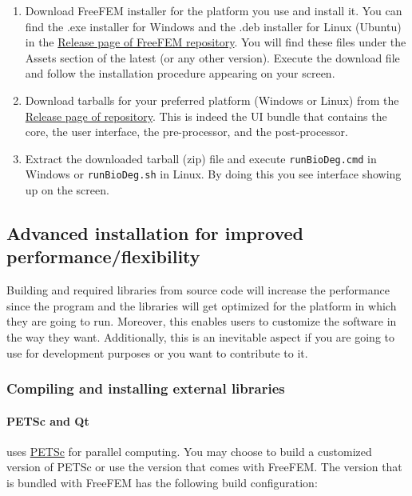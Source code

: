 \begin{enumerate}
\item
Download FreeFEM installer for the platform you use and install it. You can find the {.exe} installer for Windows and the {.deb} installer for Linux (Ubuntu) in the \href{https://github.com/FreeFem/FreeFem-sources/releases}{Release page of FreeFEM repository}. You will find these files under the Assets section of the latest (or any other version). Execute the download file and follow the installation procedure appearing on your screen.
\item
Download \biodeg{} tarballs for your preferred platform (Windows or Linux) from the \href{https://github.com/mbarzegary/BioDeg-UI/releases}{Release page of \biodeg{} repository}. This is indeed the \biodeg{} UI bundle that contains the \biodeg{} core, the user interface, the pre-processor, and the post-processor.
\item
Extract the downloaded tarball (zip) file and execute \verb|runBioDeg.cmd| in Windows or \verb|runBioDeg.sh| in Linux. By doing this you see \biodeg{} interface showing up on the screen.
\end{enumerate}




\subsection{Advanced installation for improved performance/flexibility}

Building \biodeg{} and required libraries from source code will increase the performance since the program and the libraries will get optimized for the platform in which they are going to run. Moreover, this enables users to customize the software in the way they want. Additionally, this is an inevitable aspect if you are going to use \biodeg{} for development purposes or you want to contribute to it.

\subsubsection{Compiling and installing external libraries}

\paragraph{PETSc and Qt}

\biodeg{} uses \href{https://petsc.org/release/}{PETSc} for parallel computing. You may choose to build a customized version of PETSc or use the version that comes with FreeFEM. The version that is bundled with FreeFEM has the following build configuration:

